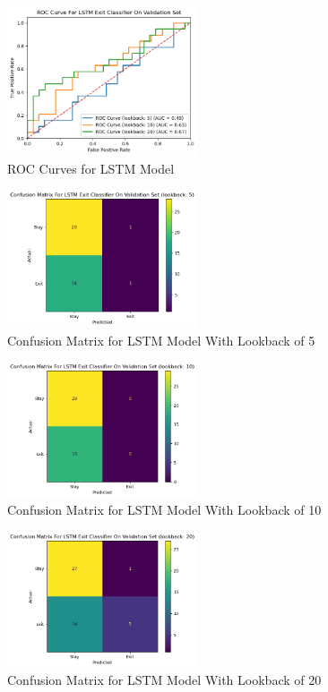 \documentclass[11pt]{article}
\begin{document}
\begin{figure}[H]
    \centering
    \includegraphics[width=0.5\textwidth]{roc_curve.png} 
    \caption{ROC Curves for LSTM Model}
    \label{fig:example}
\end{figure}

\begin{figure}[H]
    \centering
    \includegraphics[width=0.5\textwidth]{conf_matrix1.png} 
    \caption{Confusion Matrix for LSTM Model With Lookback of 5}
    \label{fig:example}
\end{figure}

\begin{figure}[H]
    \centering
    \includegraphics[width=0.5\textwidth]{conf_matrix2.png} 
    \caption{Confusion Matrix for LSTM Model With Lookback of 10}
    \label{fig:example}
\end{figure}

\begin{figure}[H]
    \centering
    \includegraphics[width=0.5\textwidth]{conf_matrix3.png} 
    \caption{Confusion Matrix for LSTM Model With Lookback of 20}
    \label{fig:example}
\end{figure}
\end{document}
